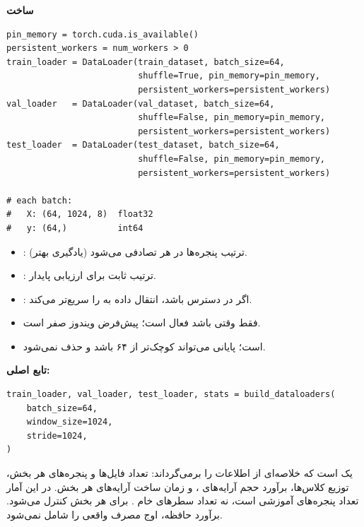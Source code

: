 \documentclass{article}
\newcommand{\pmdash}{\lr{---}}
\newcommand{\mysubsection}[1]{
\par\vspace{0.5cm}
\noindent\textcolor{main_blue}{\large\textbf{#1}}
\par\vspace{0.2cm}
}
\begin{document}
\mysubsection{ساخت }

\begin{latin}
\begin{lstlisting}
pin_memory = torch.cuda.is_available()
persistent_workers = num_workers > 0
train_loader = DataLoader(train_dataset, batch_size=64,
                          shuffle=True, pin_memory=pin_memory,
                          persistent_workers=persistent_workers)
val_loader   = DataLoader(val_dataset, batch_size=64,
                          shuffle=False, pin_memory=pin_memory,
                          persistent_workers=persistent_workers)
test_loader  = DataLoader(test_dataset, batch_size=64,
                          shuffle=False, pin_memory=pin_memory,
                          persistent_workers=persistent_workers)

# each batch:
#   X: (64, 1024, 8)  float32
#   y: (64,)          int64
\end{lstlisting}
\end{latin}

\begin{itemize}
\item {}:  \pmdash{} ترتیب پنجره‌ها در هر  تصادفی می‌شود (یادگیری بهتر).
\item {}:  \pmdash{} ترتیب ثابت برای ارزیابی پایدار.
\item {}: اگر  در دسترس باشد، انتقال داده به  را سریع‌تر می‌کند.
\item {} فقط وقتی  باشد فعال است؛ پیش‌فرض ویندوز صفر است.
\item {} است؛  پایانی می‌تواند کوچک‌تر از ۶۴ باشد و حذف نمی‌شود.
\end{itemize}

\mysubsection{تابع اصلی: }

\begin{latin}
\begin{lstlisting}
train_loader, val_loader, test_loader, stats = build_dataloaders(
    batch_size=64,
    window_size=1024,
    stride=1024,
)
\end{lstlisting}
\end{latin}

 یک  است که خلاصه‌ای از اطلاعات  را برمی‌گرداند:
تعداد فایل‌ها و پنجره‌های هر بخش، توزیع کلاس‌ها، برآورد حجم آرایه‌های ، و زمان
ساخت آرایه‌های هر بخش.  در این آمار تعداد پنجره‌های آموزشی است،
نه تعداد سطرهای خام .  برای هر بخش
کنترل می‌شود. برآورد حافظه، اوج مصرف واقعی  را شامل نمی‌شود.
\end{document}
